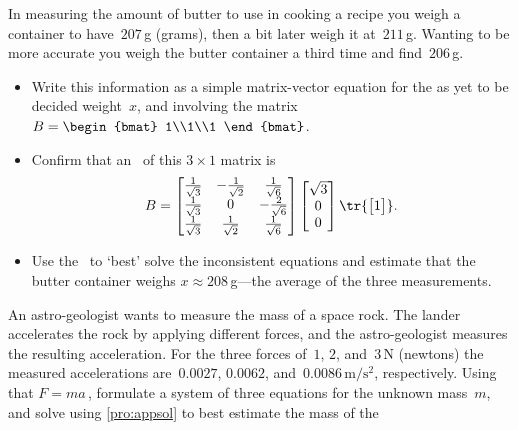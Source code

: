 \begin{exercise}  
In measuring the amount of butter to use in cooking a recipe you weigh a container to have~\(207\)\,g (grams), then a bit later weigh it at~\(211\)\,g.  
Wanting to be more accurate you weigh the butter container a third time and find~\(206\)\,g.
\begin{itemize}
\item Write this information as a simple matrix-vector equation for the as yet to be decided weight~\(x\), and involving the matrix \(B=\begin{bmat} 1\\1\\1 \end{bmat}\).
\item Confirm that an \svd\ of this \(3\times1\) matrix is
\begin{equation*}
B=\begin{bmatrix} \frac1{\sqrt3}&-\frac1{\sqrt2}&\frac1{\sqrt6}
\\\frac1{\sqrt3}&0&-\frac2{\sqrt6}
\\\frac1{\sqrt3}&\frac1{\sqrt2}&\frac1{\sqrt6}\end{bmatrix}
\begin{bmatrix} \sqrt3\\0\\0 \end{bmatrix}
\tr{\begin{bmatrix} 1 \end{bmatrix}}.
\end{equation*}
\item Use the \svd\ to `best' solve the inconsistent equations and estimate that the butter container weighs \(x\approx 208\)\,g---the average of the three measurements.
\end{itemize}
\end{exercise}

\begin{exercise}  
An astro-geologist wants to measure the mass of a space rock.
The lander accelerates the rock by applying different forces, and the astro-geologist measures the resulting acceleration.
For the three forces of~\(1\), \(2\), and~\(3\)\,N (newtons) the measured accelerations are~\(0.0027\), \(0.0062\), and~\(0.0086\,\text{m}/\text{s}^2\), respectively. 
Using  that \(F=ma\)\,, formulate a system of three equations for the unknown mass~\(m\), and solve using \cref{pro:appsol} to best estimate the mass of the 
\end{exercise}


